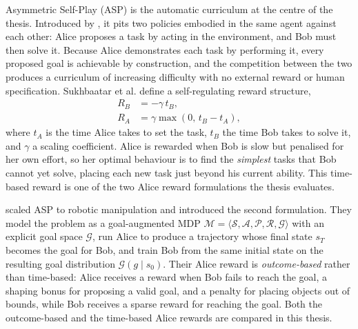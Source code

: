 Asymmetric Self-Play (ASP) is the automatic curriculum at the centre of the
thesis. Introduced by \cite{Sukhbaatar2018IntrinsicMotivation}, it pits two
policies embodied in the same agent against each other: Alice proposes a task by
acting in the environment, and Bob must then solve it. Because Alice
demonstrates each task by performing it, every proposed goal is achievable by
construction, and the competition between the two produces a curriculum of
increasing difficulty with no external reward or human specification. Sukhbaatar
et al. define a self-regulating reward structure,
\begin{align}
    R_B &= -\gamma\, t_B, \label{eq:sukh_bob}\\
    R_A &= \gamma \max(0,\, t_B - t_A), \label{eq:sukh_alice}
\end{align}
where $t_A$ is the time Alice takes to set the task, $t_B$ the time Bob takes to
solve it, and $\gamma$ a scaling coefficient. Alice is rewarded when Bob is slow
but penalised for her own effort, so her optimal behaviour is to find the
\emph{simplest} tasks that Bob cannot yet solve, placing each new task just beyond
his current ability. This time-based reward is one of the two Alice reward
formulations the thesis evaluates.

\cite{OpenAI2021AsymmetricSF} scaled ASP to robotic manipulation and introduced
the second formulation. They model the problem as a goal-augmented MDP
$\mathcal{M} = \langle \mathcal{S}, \mathcal{A}, \mathcal{P}, \mathcal{R},
\mathcal{G} \rangle$ with an explicit goal space $\mathcal{G}$, run Alice to
produce a trajectory whose final state $s_T$ becomes the goal for Bob, and train
Bob from the same initial state on the resulting goal distribution $\mathcal{G}(g
\mid s_0)$. Their Alice reward is \emph{outcome-based} rather than time-based:
Alice receives a reward when Bob fails to reach the goal, a shaping bonus for
proposing a valid goal, and a penalty for placing objects out of bounds, while
Bob receives a sparse reward for reaching the goal. Both the outcome-based and
the time-based Alice rewards are compared in this thesis.

